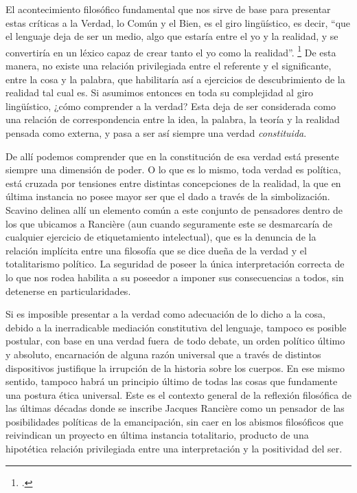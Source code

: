 El acontecimiento filosófico fundamental que nos sirve de base para presentar estas críticas a la Verdad, lo Común y el Bien, es el giro lingüístico, es decir, \enquote{que el lenguaje deja de ser un medio, algo que estaría entre el yo y la realidad, y se convertiría en un léxico capaz de crear tanto el yo como la realidad}. \footcite[][12]{@7062-SCAVINO2010} De esta manera, no existe una relación privilegiada entre el referente y el significante, entre la cosa y la palabra, que habilitaría así a ejercicios de descubrimiento de la realidad tal cual es. Si asumimos entonces en toda su complejidad al giro lingüístico, ¿cómo comprender a la verdad? Esta deja de ser considerada como una relación de correspondencia entre la idea, la palabra, la teoría y la realidad pensada como externa, y pasa a ser así siempre una verdad \emph{constituida}.

De allí podemos comprender que en la constitución de esa verdad está presente siempre una dimensión de poder. O lo que es lo mismo, toda verdad es política, está cruzada por tensiones entre distintas concepciones de la realidad, la que en última instancia no posee mayor ser que el dado a través de la simbolización. Scavino delinea allí un elemento común a este conjunto de pensadores dentro de los que ubicamos a Rancière (aun cuando seguramente este se desmarcaría de cualquier ejercicio de etiquetamiento intelectual), que es la denuncia de la relación implícita entre una filosofía que se dice dueña de la verdad y el totalitarismo político. La seguridad de poseer la única interpretación correcta de lo que nos rodea habilita a su poseedor a imponer sus consecuencias a todos, sin detenerse en particularidades.

Si es imposible presentar a la verdad como adecuación de lo dicho a la cosa, debido a la inerradicable mediación constitutiva del lenguaje, tampoco es posible postular, con base en una verdad fuera~de todo debate, un orden político último y absoluto, encarnación de alguna razón universal que a través de distintos dispositivos justifique la irrupción de la historia sobre los cuerpos. En ese mismo sentido, tampoco habrá un principio último de todas las cosas que fundamente una postura ética universal. Este es el contexto general de la reflexión filosófica de las últimas décadas donde se inscribe Jacques Rancière como un pensador de las posibilidades políticas de la emancipación, sin caer en los abismos filosóficos que reivindican un proyecto en última instancia totalitario, producto de una hipotética relación privilegiada entre una interpretación y la positividad del ser.

